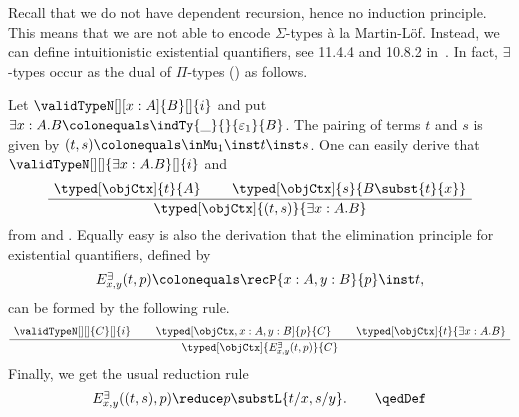 \documentclass[preprint]{sigplanconf}
\begin{document}
\begin{example}
  \label{ex:exists-quant-encode}
  Recall that we do not have dependent recursion, hence
  no induction principle.
  This means that we are not able to encode $\Sigma$-types à la Martin-Löf.
  Instead, we can define intuitionistic existential quantifiers,
  see 11.4.4 and 10.8.2 in~\cite{TroelstraDalen-ConstrMath}.
  In fact, $\exists$-types occur as the dual of $\Pi$-types ()
  as follows.

  Let $\validTypeN[][x : A]{B}[]{i}$ and put
  $\exists x:A. B \colonequals \indTy{\_}{}{\varepsilon_1}{B}$.
  The pairing of terms $t$ and $s$ is given by
  $(t, s) \colonequals \inMu_1 \inst t \inst s$.
  One can easily derive that $\validTypeN[][]{\exists x:A. B}[]{i}$ and
  \begin{equation*}
    \AxiomC{$\typed[\objCtx]{t}{A}$}
    \AxiomC{$\typed[\objCtx]{s}{B \subst{t}{x}}$}
    \BinaryInfC{$\typed[\objCtx]{(t,s)}{\exists x:A. B}$}
    \DisplayProof
  \end{equation*}
  from  and \Inst.
  Equally easy is also the derivation that the elimination principle for
  existential quantifiers, defined by
  \begin{equation*}
    \cramped{E_{x,y}^\exists}(t, p) \colonequals \recP{x : A, y : B}{p} \inst t,
  \end{equation*}
  can be formed by the following rule.
  \begin{equation*}
    \AxiomC{$\validTypeN[][]{C}[]{i}$}
    \AxiomC{$\typed[\objCtx, x : A, y : B]{p}{C}$}
    \AxiomC{$\typed[\objCtx]{t}{\exists x:A. B}$}
    \TrinaryInfC{$\typed[\objCtx]{\cramped{E_{x,y}^\exists}(t, p)}{C}$}
    \DisplayProof
  \end{equation*}
  Finally, we get the usual reduction rule
  \begin{equation*}
    \cramped{E_{x,y}^\exists} ((t, s), p) \reduce p \substL{t/x, s/y}.
    \tag*{\qedDef}
  \end{equation*}
\end{example}
\end{document}
